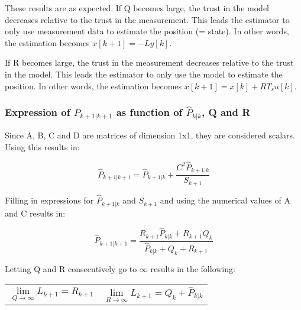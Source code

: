 \documentclass[a4paper]{article}
\newcommand{\newpar}{\vspace{.3cm}\noindent}
\begin{document}
\newpar
These results are as expected. If Q becomes large, the trust in the model decreases relative to the trust in the measurement. This leads the estimator to only use measurement data to estimate the position (= state). In other words, the estimation becomes \(x[k+1] = -Ly[k]\).

\newpar
If R becomes large, the trust in the measurement decreases relative to the trust in the model. This leads the estimator to only use the model to estimate the position. In other words, the estimation becomes \(x[k+1] = x[k] + RT_{s}u[k]\).

\subsubsection{Expression of \(\hat{P}_{k+1|k+1}\) as function of \(\hat{P}_{k|k}\), Q and R}

Since A, B, C and D are matrices of dimension 1x1, they are considered scalars. Using this results in:

\begin{equation}
    \hat{P}_{k+1|k+1} = \hat{P}_{k+1|k} + \frac{C^2\hat{P}_{k+1|k}}{S_{k+1}}
\end{equation}

\newpar
Filling in expressions for \(\hat{P}_{k+1|k}\) and \(S_{k+1}\) and using the numerical values of A and C results in:

\begin{equation}
    \hat{P}_{k+1|k+1} = \frac{R_{k+1}\hat{P}_{k|k} + R_{k+1}Q_{k}}{\hat{P}_{k|k} + Q_{k} + R_{k+1}}
    \label{eq:2cP}
\end{equation}

\newpar
Letting Q and R consecutively go to \(\infty\) results in the following:

\begin{center}
    \begin{tabular}{p{6cm}p{6cm}}
        \begin{equation}
            \lim_{Q\to\infty} L_{k+1} = R_{k+1}
            \label{eq:PQinf}
        \end{equation}
        &  
        \begin{equation}
            \lim_{R\to\infty} L_{k+1} = Q_{k} + \hat{P}_{k|k}
            \label{eq:PRinf}
        \end{equation}
        
    \end{tabular}
\end{center}
\end{document}
